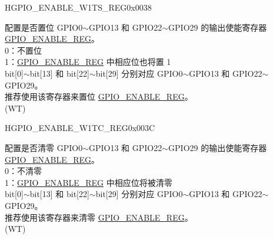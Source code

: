 \begin{register}{H}{GPIO\_ENABLE\_W1TS\_REG}{0x0038}\label{regdesc:GPIOENABLEW1TSREG}
%
\regnewline%
\begin{regdesc}\begin{reglist}
\label{fielddesc:GPIOENABLEW1TS}\item [GPIO\_ENABLE\_W1TS] 配置是否置位 GPIO0$\sim$GPIO13 和 GPIO22$\sim$GPIO29 的输出使能寄存器 \hyperref[regdesc:GPIOENABLEREG]{GPIO\_ENABLE\_REG}。\\
0：不置位\\
1：\hyperref[regdesc:GPIOENABLEREG]{GPIO\_ENABLE\_REG} 中相应位也将置 1\\
bit[0]$\sim$bit[13] 和 bit[22]$\sim$bit[29] 分别对应 GPIO0$\sim$GPIO13 和 GPIO22$\sim$GPIO29。\\
推荐使用该寄存器来置位 \hyperref[regdesc:GPIOENABLEREG]{GPIO\_ENABLE\_REG}。\\ (WT)
\end{reglist}\end{regdesc}
\end{register}


\begin{register}{H}{GPIO\_ENABLE\_W1TC\_REG}{0x003C}\label{regdesc:GPIOENABLEW1TCREG}
%
\regnewline%
\begin{regdesc}\begin{reglist}
\label{fielddesc:GPIOENABLEW1TC}\item [GPIO\_ENABLE\_W1TC] 配置是否清零 GPIO0$\sim$GPIO13 和 GPIO22$\sim$GPIO29 的输出使能寄存器 \hyperref[regdesc:GPIOENABLEREG]{GPIO\_ENABLE\_REG}。\\
0：不清零\\
1：\hyperref[regdesc:GPIOENABLEREG]{GPIO\_ENABLE\_REG} 中相应位将被清零\\
bit[0]$\sim$bit[13] 和 bit[22]$\sim$bit[29] 分别对应 GPIO0$\sim$GPIO13 和 GPIO22$\sim$GPIO29。\\
推荐使用该寄存器来清零 \hyperref[regdesc:GPIOENABLEREG]{GPIO\_ENABLE\_REG}。\\ (WT)
\end{reglist}\end{regdesc}
\end{register}


